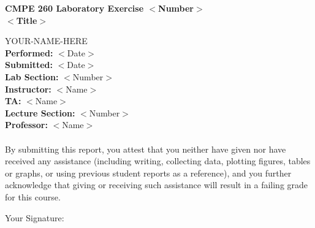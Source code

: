 \documentclass[letterpaper]{article}
\begin{document}
	
	\begin{adjustwidth*}{2cm}{2cm}
		
		\begin{center}
		\textbf{CMPE 260 Laboratory Exercise $<$Number$>$ 
				\\	\vspace{0.5cm} $<$Title$>$}
		\end{center}
		\vspace{12cm}
		\tabto{8cm} YOUR-NAME-HERE \\
		\tabto{8cm} \textbf{Performed: }$<$Date$>$ \\
		\tabto{8cm} \textbf{Submitted: }$<$Date$>$ \\
		\vspace{0.5cm}
		\tabto{8cm} \textbf{Lab Section: }$<$Number$>$ \\
		\tabto{8cm} \textbf{Instructor: }$<$Name$>$ \\
		\tabto{8cm} \textbf{TA: }$<$Name$>$ \\
		\vspace{0.5cm}
		\tabto{8cm} \textbf{Lecture Section: }$<$Number$>$ \\
		\tabto{8cm} \textbf{Professor: }$<$Name$>$ \\
		\vspace{1cm} \\
		By submitting this report, you attest that you neither have given nor have received any assistance (including writing, collecting data, plotting figures, tables or graphs, or using previous student reports as a reference), and you further acknowledge that giving or receiving such assistance will result in a failing grade for this course.
		
		\vspace{1cm}
		\tabto{1.5cm} Your Signature: \hrulefill
	\end{adjustwidth*}	
	
	
	\renewcommand*\contentsname{Table of Contents \hrulefill}
	\tableofcontents
		
	\newpage
	
	
	
	
	
	
\end{document}
